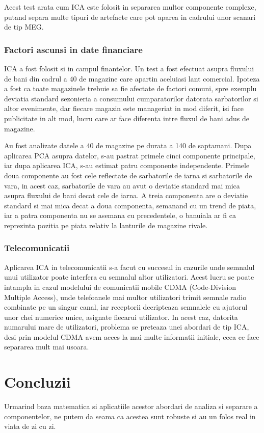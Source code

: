 \documentclass[12pt,oneside]{article}
\begin{document}
 Acest test arata cum ICA este folosit in separarea multor componente complexe, putand separa multe tipuri de artefacte care pot aparea in cadrului unor scanari de tip MEG.

 \subsubsection{Factori ascunsi in date financiare}
 ICA a fost folosit si in campul finantelor. Un test a fost efectuat asupra fluxului de bani din cadrul a 40 de magazine care apartin aceluiasi lant comercial. Ipoteza a fost ca toate magazinele trebuie sa fie afectate de factori comuni, spre exemplu deviatia standard sezonieria a consumului cumparatorilor datorata sarbatorilor si altor evenimente, dar fiecare magazin este manageriat in mod diferit, isi face publicitate in alt mod, lucru care ar face diferenta intre fluxul de bani adus de magazine. 

 Au fost analizate datele a 40 de magazine pe durata a 140 de saptamani. Dupa aplicarea PCA asupra datelor, s-au pastrat primele cinci componente principale, iar dupa aplicarea ICA, s-au estimat patru componente independente. Primele doua componente au fost cele reflectate de sarbatorile de iarna si sarbatorile de vara, in acest caz, sarbatorile de vara au avut o deviatie standard mai mica asupra fluxului de bani decat cele de iarna. A treia componenta are o deviatie standard si mai mica decat a doua componenta, semanand cu un trend de piata, iar a patra componenta nu se asemana cu precedentele, o banuiala ar fi ca reprezinta pozitia pe piata relativ la lanturile de magazine rivale.

 \subsubsection{Telecomunicatii}
Aplicarea ICA in telecomunicatii s-a facut cu succesul in cazurile unde semnalul unui utilizator poate interfera cu semnalul altor utilizatori. Acest lucru se poate intampla in cazul modelului de comunicatii mobile CDMA (Code-Division Multiple Access), unde telefoanele mai multor utilizatori trimit semnale radio combinate pe un singur canal, iar receptorii decripteaza semnalele cu ajutorul unor chei numerice unice, asignate fiecarui utilizator. In acest caz, datorita numarului mare de utilizatori, problema se preteaza unei abordari de tip ICA, desi prin modelul CDMA avem acces la mai multe informatii initiale, ceea ce face separarea mult mai usoara.
\newpage
\section{Concluzii}
Urmarind baza matematica si aplicatiile acestor abordari de analiza si separare a componentelor, ne putem da seama ca acestea sunt robuste si au un folos real in viata de zi cu zi. 
\end{document}

